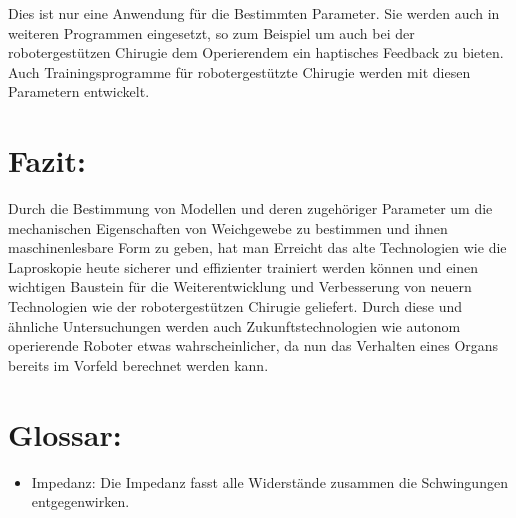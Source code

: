 \documentclass[11pt]{article}
\begin{document}
		Dies ist nur eine Anwendung für die Bestimmten Parameter. Sie werden auch in weiteren 
		Programmen eingesetzt, so zum Beispiel um auch bei der robotergestützen Chirugie dem 
		Operierendem ein haptisches Feedback zu bieten. Auch Trainingsprogramme für 
		robotergestützte Chirugie werden mit diesen Parametern entwickelt.
			
 
			  

			
	\section{Fazit:}
		Durch die Bestimmung von Modellen und deren zugehöriger Parameter um die mechanischen
		Eigenschaften von Weichgewebe zu bestimmen und ihnen maschinenlesbare Form zu geben, hat
		man Erreicht das alte Technologien wie die Laproskopie heute sicherer und effizienter 
		trainiert werden können und einen wichtigen Baustein für die Weiterentwicklung und 
		Verbesserung von neuern Technologien wie der robotergestützen Chirugie geliefert.
		Durch diese und ähnliche Untersuchungen werden auch Zukunftstechnologien wie autonom
		operierende Roboter etwas wahrscheinlicher, da nun das Verhalten eines Organs bereits im 
		Vorfeld berechnet werden kann. 
		
		 
			  
			
	\section{Glossar:}
	\begin{itemize}
		\item Impedanz: Die Impedanz fasst alle Widerstände zusammen die Schwingungen entgegenwirken.
	\end{itemize}
			 
		  
\end{document}
